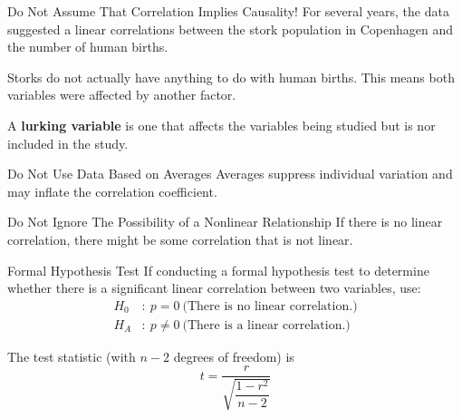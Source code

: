 \documentclass{beamer}
\newcommand{\nullhypothesis}[1]{H_0&:~{#1}}
\newcommand{\althypothesis}[1]{H_A&:~{#1}}
\begin{document}
\begin{frame}
\begin{block}{Do Not Assume That Correlation Implies Causality!}
For several years, the data suggested a linear correlations between the stork population in Copenhagen and the number of human births.\pause

\vspace{1mm}
Storks do not actually have anything to do with human births. This means both variables were affected by another factor.
\end{block}\pause

\begin{definition}
A \textbf{lurking variable} is one that affects the variables being studied but is nor included in the study.
\end{definition}\pause

\begin{block}{Do Not Use Data Based on Averages}
Averages suppress individual variation and may inflate the correlation coefficient.
\end{block}\pause

\begin{block}{Do Not Ignore The Possibility of a Nonlinear Relationship}
If there is no linear correlation, there might be some correlation that is not linear.
\end{block}
\end{frame}

\begin{frame}
\begin{block}{Formal Hypothesis Test}
If conducting a formal hypothesis test to determine whether there is a significant linear correlation between two variables, use:
\begin{equation*}
\begin{aligned}
\nullhypothesis{p=0~\text{(There is no linear correlation.)}} \\
\althypothesis{p\neq 0~\text{(There is a linear correlation.)}}
\end{aligned}
\end{equation*}\pause

The test statistic (with $n-2$ degrees of freedom) is
\begin{equation*}
t=\dfrac{r}{\sqrt{\dfrac{1-r^2}{n-2}}}
\end{equation*}
\end{block}
\end{frame}
\end{document}
